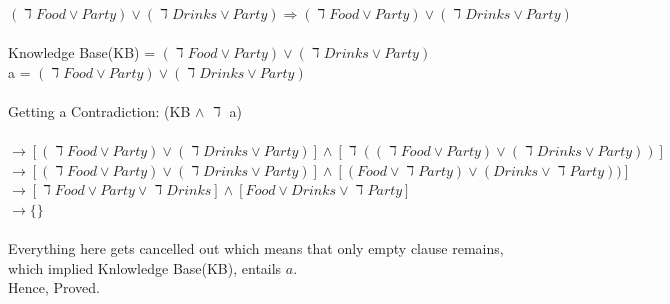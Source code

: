 \documentclass[11pt]{article}
\begin{document}
$(\daleth Food \vee Party) \vee (\daleth Drinks \vee Party) \Rightarrow (\daleth Food \vee Party) \vee (\daleth Drinks \vee Party)$\\ \\
Knowledge Base(KB) = $(\daleth Food \vee Party) \vee (\daleth Drinks \vee Party)$\\
a = $(\daleth Food \vee Party) \vee (\daleth Drinks \vee Party)$\\ \\
Getting a Contradiction: (KB $\wedge$ $\daleth$ a)\\ \\
$\rightarrow [(\daleth Food \vee Party) \vee (\daleth Drinks \vee Party)] \wedge [\daleth((\daleth Food \vee Party) \vee (\daleth Drinks \vee Party))]$\\
$\rightarrow [(\daleth Food \vee Party) \vee (\daleth Drinks \vee Party)] \wedge [( Food \vee \daleth Party) \vee ( Drinks \vee \daleth Party))]$\\
$\rightarrow [\daleth Food \vee Party \vee \daleth Drinks] \wedge [ Food \vee Drinks \vee \daleth Party]$\\
$\rightarrow \{  \}$ \\ \\
Everything here gets cancelled out which means that only empty clause remains, which implied Knlowledge Base(KB), entails $a$. \\
Hence, Proved.
\end{document}
